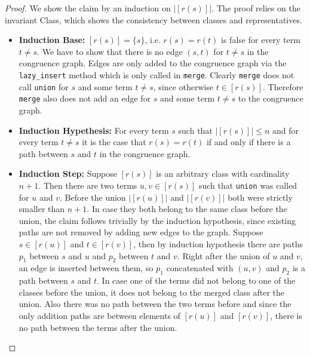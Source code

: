 \begin{proof}

We show the claim by an induction on $|[r(s)]|$.
The proof relies on the invariant Class, which shows the consistency between classes and representatives.

\begin{itemize}
\item \textbf{Induction Base:} $[r(s)] = \{s\}$, i.e. $r(s) = r(t)$ is false for every term $t \neq s$.
We have to show that there is no edge $(s,t)$ for $t \neq s$ in the congruence graph.
Edges are only added to the congruence graph via the \texttt{lazy\_insert} method which is only called in \texttt{merge}.
Clearly \texttt{merge} does not call \texttt{union} for $s$ and some term $t \neq s$, since otherwise $t \in [r(s)]$.
Therefore \texttt{merge} also does not add an edge for $s$ and some term $t \neq s$ to the congruence graph.

\item \textbf{Induction Hypethesis:} For every term $s$ such that $|[r(s)]| \leq n$ and for every term $t \neq s$ it is the case that $r(s) = r(t)$ if and only if there is a path between $s$ and $t$ in the congruence graph.

\item \textbf{Induction Step:} Suppose $[r(s)]$ is an arbitrary class with cardinality $n+1$.
Then there are two terms $u,v \in [r(s)]$ such that \texttt{union} was called for $u$ and $v$.
Before the union $|[r(u)]|$ and $|[r(v)]|$ both were strictly smaller than $n+1$.
In case they both belong to the same class before the union, the claim follows trivially by the induction hypothesis, since existing paths are not removed by adding new edges to the graph.
Suppose $s \in [r(u)]$ and $t \in [r(v)]$, then by induction hypothesis there are paths $p_1$ between $s$ and $u$ and $p_2$ between $t$ and $v$.
Right after the union of $u$ and $v$, an edge is inserted between them, so $p_1$ concatenated with $(u,v)$ and $p_2$ is a path between $s$ and $t$.
In case one of the terms did not belong to one of the classes before the union, it does not belong to the merged class after the union.
Also there was no path between the two terms before and since the only addition paths are between elements of $[r(u)]$ and $[r(v)]$, there is no path between the terms after the union.
\end{itemize}

\end{proof}

